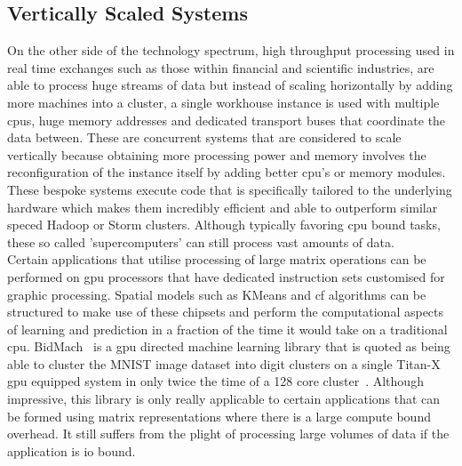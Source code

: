 \documentclass[a4paper,11pt]{scrreprt}
\begin{document}
\subsection{Vertically Scaled Systems}
On the other side of the technology spectrum, high throughput processing used in real time exchanges such as those within financial and scientific industries, are able to process huge streams of data but instead of scaling horizontally by adding more machines into a cluster, a single workhouse instance is used with multiple \acrshort{cpu}s, huge memory addresses and dedicated transport buses that coordinate the data between. These are concurrent systems that are considered to scale vertically because obtaining more processing power and memory involves the reconfiguration of the instance itself by adding better \acrshort{cpu}'s or memory modules. These bespoke systems execute code that is specifically tailored to the underlying hardware which makes them incredibly efficient and able to outperform similar speced Hadoop or Storm clusters. Although typically favoring \acrshort{cpu} bound tasks, these so called 'supercomputers' can still process vast amounts of data.\\

Certain applications that utilise processing of large matrix operations can be performed on \acrshort{gpu} processors that have dedicated instruction sets customised for graphic processing. Spatial models such as KMeans and \acrshort{cf} algorithms can be structured to make use of these chipsets and perform the computational aspects of learning and prediction in a fraction of the time it would take on a traditional \acrshort{cpu}. BidMach~\cite{bidmach} is a \acrshort{gpu} directed machine learning library that is quoted as being able to cluster the MNIST image dataset into digit clusters on a single Titan-X \acrshort{gpu} equipped system in only twice the time of a 128 core cluster~\cite{bidmachbench}. Although impressive, this library is only really applicable to certain applications that can be formed using matrix representations where there is a large compute bound overhead. It still suffers from the plight of processing large volumes of data if the application is \acrshort{io} bound.
\end{document}
